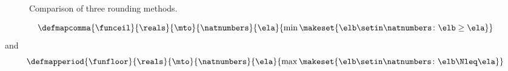 \begin{figure*}[b]
    \centering
    \hfill
    \hfill
    \caption{Comparison of three rounding methods.}
\end{figure*}
\begin{forslides}
    \begin{equation}\label{eq:funceil-scalar}
        \defmapcomma{
            \funceil
        }{
            \reals
        }{
            \mto
        }{
            \natnumbers
        }{
            \ela
        }{
            \min \makeset{\elb \setin \natnumbers \colon \elb \geq \ela }
        }
    \end{equation}
    and
    \begin{equation}\label{eq:funfloor-scalar}
        \defmapperiod{
            \funfloor
        }{
            \reals
        }{
            \mto
        }{
            \natnumbers
        }{
            \ela
        }{
            \max \makeset{\elb \setin \natnumbers \colon \elb \Nleq \ela }
        }
    \end{equation}
\end{forslides}
